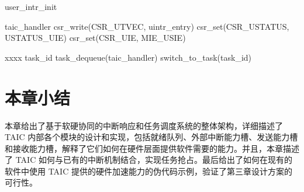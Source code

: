 \begin{algorithm}
  \caption{user\_intr\_init}
  \label{alg:uintr}
  \begin{algorithmic}[1]
    \State taic\_handler
      \State csr\_write(CSR\_UTVEC, uintr\_entry) 
      \State csr\_set(CSR\_USTATUS, USTATUS\_UIE)
      \State csr\_set(CSR\_UIE, MIE\_USIE) 
    \EndFunction

      \State xxxx 
      \State task\_id \gets task\_dequeue(taic\_handler) 
      \State switch\_to\_task(task\_id) 
    \EndFunction
  \end{algorithmic}
\end{algorithm}

\section{本章小结}

本章给出了基于软硬协同的中断响应和任务调度系统的整体架构，详细描述了 TAIC 内部各个模块的设计和实现，包括就绪队列、外部中断能力槽、发送能力槽和接收能力槽，解释了它们如何在硬件层面提供软件需要的能力。并且，本章描述了 TAIC 如何与已有的中断机制结合，实现任务抢占。最后给出了如何在现有的软件中使用 TAIC 提供的硬件加速能力的伪代码示例，验证了第三章设计方案的可行性。

